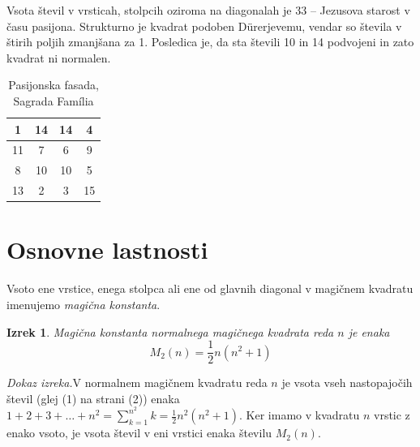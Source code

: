 \documentclass[a4paper,12pt]{article}
\begin{document}
Vsota števil v vrsticah, stolpcih oziroma na diagonalah je 33 -- Jezusova starost
v času pasijona. Strukturno je kvadrat podoben Dürerjevemu, vendar so števila
v štirih poljih zmanjšana za 1. Posledica je, da sta števili 10 in 14 podvojeni
in zato kvadrat ni normalen.
\begin{table}
   \centering
   \caption{Pasijonska fasada, Sagrada Família}
   \label{agrada}
   \begin{tabular}{|c|c|c|c|}
      \hline
      1 & 14 & 14 &  4 \\\hline
         11 &  7 &  6 &  9 \\\hline
         8 & 10 & 10 &  5 \\\hline
         13 &  2 &  3 & 15 \\\hline
      
      
   \end{tabular}

\end{table}


\section{Osnovne lastnosti}

 \begin{definicija}
      Vsoto ene vrstice, enega stolpca ali ene od glavnih diagonal
      v magičnem kvadratu imenujemo \emph{magična konstanta}.
%
 \end{definicija}
 \theoremstyle{definition}
 \newtheorem{izrek}{Izrek}
\begin{izrek}
   \emph{Magična konstanta normalnega magičnega kvadrata reda $n$
   je enaka}
   \begin{equation}
      M_2(n) = \frac{1}{2} n(n^2+1)
   \end{equation}
\end{izrek}
   \emph{Dokaz izreka.}V normalnem magičnem kvadratu reda $n$ je vsota vseh nastopajočih
   števil (glej (1) na strani (2)) enaka
   $1+2+3+\dots+n^2=\sum_{k=1}^{n^2}k=\frac{1}{2}n^2(n^2+1)$. Ker imamo
   v kvadratu $n$ vrstic z enako vsoto, je vsota števil v eni vrstici
   enaka številu $M_2(n)$. %
\end{document}
